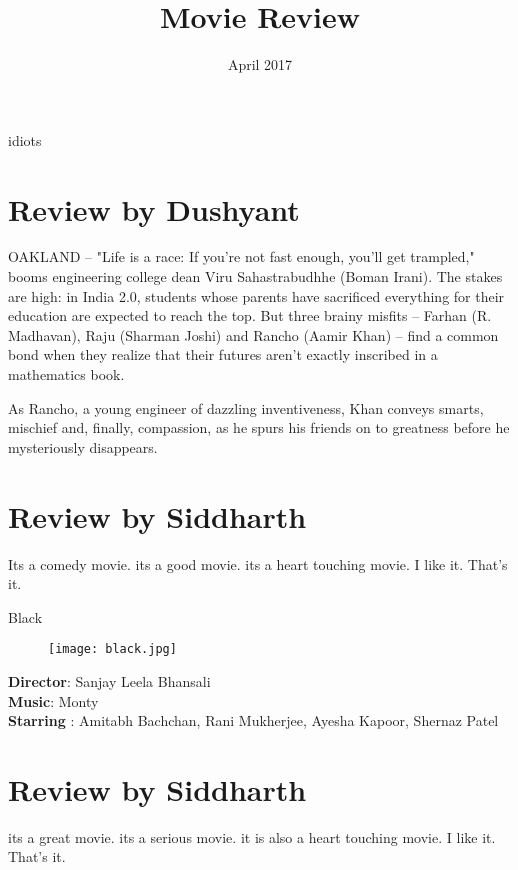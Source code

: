 \documentclass{article}
\title{Movie Review}
\date{April 2017}
\begin{document}
 idiots

\section{Review by Dushyant}
OAKLAND -- "Life is a race: If you're not fast enough, you'll get trampled," booms engineering college dean Viru Sahastrabudhhe (Boman Irani). The stakes are high: in India 2.0, students whose parents have sacrificed everything for their education are expected to reach the top. But three brainy misfits -- Farhan (R. Madhavan), Raju (Sharman Joshi) and Rancho (Aamir Khan) -- find a common bond when they realize that their futures aren't exactly inscribed in a mathematics book.

As Rancho, a young engineer of dazzling inventiveness, Khan conveys smarts, mischief and, finally, compassion, as he spurs his friends on to greatness before he mysteriously disappears.

\section{Review by Siddharth}Its a comedy movie. its a good movie. its a heart touching movie. I like it. That's it.



  


\maketitle
Black

\begin{figure}[h!]
  \texttt{[image: black.jpg]}
\end{figure}
\begin{flushleft}
\textsf{\textbf{Director}: Sanjay Leela Bhansali\\ 
        \textbf{Music}: Monty\\
        \textbf{Starring} : Amitabh Bachchan, Rani Mukherjee, Ayesha Kapoor, Shernaz Patel}\\
\end{flushleft}  
                           
         \vspace{2mm}

\section{Review by Siddharth}
its a great movie. its a serious movie. it is also a heart touching movie. I like it. That's it.
\end{document}
